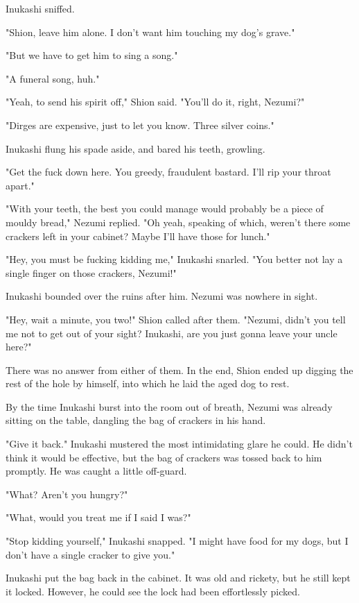 Inukashi sniffed.

"Shion, leave him alone. I don't want him touching my dog's grave."

"But we have to get him to sing a song."

"A funeral song, huh."

"Yeah, to send his spirit off," Shion said. "You'll do it, right,
Nezumi?"

"Dirges are expensive, just to let you know. Three silver coins."

Inukashi flung his spade aside, and bared his teeth, growling.

"Get the fuck down here. You greedy, fraudulent bastard. I'll rip your
throat apart."

"With your teeth, the best you could manage would probably be a piece of
mouldy bread," Nezumi replied. "Oh yeah, speaking of which, weren't
there some crackers left in your cabinet? Maybe I'll have those for
lunch."

"Hey, you must be fucking kidding me," Inukashi snarled. "You better not
lay a single finger on those crackers, Nezumi!"

Inukashi bounded over the ruins after him. Nezumi was nowhere in sight.

"Hey, wait a minute, you two!" Shion called after them. "Nezumi, didn't
you tell me not to get out of your sight? Inukashi, are you just gonna
leave your uncle here?"

There was no answer from either of them. In the end, Shion ended up
digging the rest of the hole by himself, into which he laid the aged dog
to rest.

By the time Inukashi burst into the room out of breath, Nezumi was
already sitting on the table, dangling the bag of crackers in his hand.

"Give it back." Inukashi mustered the most intimidating glare he could.
He didn't think it would be effective, but the bag of crackers was
tossed back to him promptly. He was caught a little off-guard.

"What? Aren't you hungry?"

"What, would you treat me if I said I was?"

"Stop kidding yourself," Inukashi snapped. "I might have food for my
dogs, but I don't have a single cracker to give you."

Inukashi put the bag back in the cabinet. It was old and rickety, but he
still kept it locked. However, he could see the lock had been
effortlessly picked.

